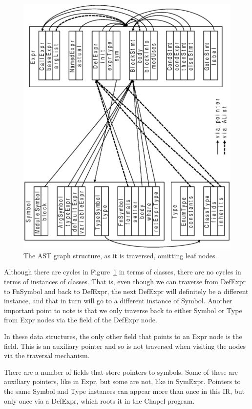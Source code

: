 \documentclass[10pt]{article}
\begin{document}
\begin{figure}[htb]
\includegraphics[angle=270,scale=0.5]{AST.ps}
\caption{The AST graph structure, as it is traversed, omitting leaf nodes.}
\label{fig:ast}
\end{figure}

Although there are cycles in Figure~\ref{fig:ast} in terms of classes,
there are no cycles in terms of instances of classes.  That is, even
though we can traverse from DefExpr to FnSymbol and back to DefExpr,
the next DefExpr will definitely be a different instance, and that in
turn will go to a different instance of Symbol.  Another important
point to note is that we only traverse back to either Symbol or Type
from Expr nodes via the  field of the DefExpr node.

In these data structures, the only other field that points to an Expr
node is the  field.  This is an auxiliary pointer and so is
not traversed when visiting the nodes via the traversal mechanism.

There are a number of fields that store pointers to symbols.  Some of
these are auxiliary pointers, like  in Expr, but some are
not, like  in SymExpr.  Pointers to the same Symbol and Type
instances can appear more than once in this IR, but only once via a
DefExpr, which roots it in the Chapel program.
\end{document}
